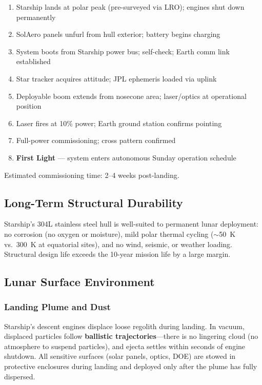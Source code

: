 \documentclass[10pt,letterpaper]{article}
\begin{document}
\begin{enumerate}[leftmargin=1.5em]
  \item Starship lands at polar peak (pre-surveyed via LRO); engines shut down permanently
  \item SolAero panels unfurl from hull exterior; battery begins charging
  \item System boots from Starship power bus; self-check; Earth comm link established
  \item Star tracker acquires attitude; JPL ephemeris loaded via uplink
  \item Deployable boom extends from nosecone area; laser/optics at operational position
  \item Laser fires at 10\% power; Earth ground station confirms pointing
  \item Full-power commissioning; cross pattern confirmed
  \item \textbf{First Light} --- system enters autonomous Sunday operation schedule
\end{enumerate}

Estimated commissioning time: 2--4 weeks post-landing.

\subsection{Long-Term Structural Durability}

Starship's 304L stainless steel hull is well-suited to permanent lunar
deployment: no corrosion (no oxygen or moisture), mild polar thermal cycling
($\sim$\SI{50}{\kelvin} vs.\ \SI{300}{\kelvin} at equatorial sites), and no
wind, seismic, or weather loading. Structural design life exceeds the
10-year mission life by a large margin.

\subsection{Lunar Surface Environment}

\subsubsection*{Landing Plume and Dust}

Starship's descent engines displace loose regolith during landing. In
vacuum, displaced particles follow \textbf{ballistic trajectories}---there is
no lingering cloud (no atmosphere to suspend particles), and ejecta settles
within seconds of engine shutdown. All sensitive surfaces (solar panels,
optics, DOE) are stowed in protective enclosures during landing and deployed
only after the plume has fully dispersed.
\end{document}
